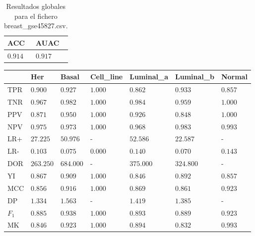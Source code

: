 \begin{table}[htp]
    \small
    \centering
    \begin{tabularx}{\columnwidth}{Y Y}
        ACC       & AUAC    \\\hline
        $0.914$   & $0.917$ \\\hline
    \end{tabularx}
    \caption{Resultados globales para el fichero breast\_gse45827.csv.}
    \label{tab:12}
\end{table}

\begin{table}[htp]
    \small
    \centering
    \begin{tabularx}{\columnwidth}{l Y Y Y Y Y Y}
                &  Her          & Basal     & Cell\_line & Luminal\_a & Luminal\_b & Normal    \\\hline
        TPR     &  $0.900$      & $0.927$   & $1.000$    & $0.862$    & $0.933$    & $0.857$   \\\hline
        TNR     &  $0.967$      & $0.982$   & $1.000$    & $0.984$    & $0.959$    & $1.000$   \\\hline
        PPV     &  $0.871$      & $0.950$   & $1.000$    & $0.926$    & $0.848$    & $1.000$   \\\hline
        NPV     &  $0.975$      & $0.973$   & $1.000$    & $0.968$    & $0.983$    & $0.993$   \\\hline
        LR+     &  $27.225$     & $50.976$  & -          & $52.586$   & $22.587$   & -         \\\hline
        LR-     &  $0.103$      & $0.075$   & $0.000$    & $0.140$    & $0.070$    & $0.143$   \\\hline
        DOR     &  $263.250$    & $684.000$ & -          & $375.000$  & $324.800$  & -         \\\hline
        YI      &  $0.867$      & $0.909$   & $1.000$    & $0.846$    & $0.892$    & $0.857$   \\\hline
        MCC     &  $0.856$      & $0.916$   & $1.000$    & $0.869$    & $0.861$    & $0.923$   \\\hline
        DP      &  $1.334$      & $1.563$   & -          & $1.419$    & $1.385$    & -         \\\hline
        $F_{1}$ &  $0.885$      & $0.938$   & $1.000$    & $0.893$    & $0.889$    & $0.923$   \\\hline
        MK      &  $0.846$      & $0.923$   & $1.000$    & $0.894$    & $0.832$    & $0.993$   \\\hline

\end{tabularx}
\end{table}
